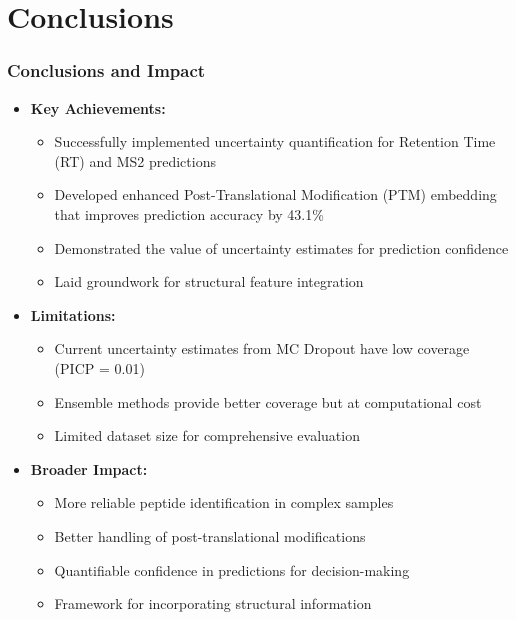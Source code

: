 \documentclass{beamer}
\begin{document}
\section{Conclusions}
\begin{frame}
  \frametitle{Conclusions and Impact}
  \begin{itemize}
    \item \textbf{Key Achievements:}
    \begin{itemize}
      \item Successfully implemented uncertainty quantification for Retention Time (RT) and MS2 predictions
      \item Developed enhanced Post-Translational Modification (PTM) embedding that improves prediction accuracy by 43.1\%
      \item Demonstrated the value of uncertainty estimates for prediction confidence
      \item Laid groundwork for structural feature integration
    \end{itemize}
    \item \textbf{Limitations:}
    \begin{itemize}
      \item Current uncertainty estimates from MC Dropout have low coverage (PICP = 0.01)
      \item Ensemble methods provide better coverage but at computational cost
      \item Limited dataset size for comprehensive evaluation
    \end{itemize}
    \item \textbf{Broader Impact:}
    \begin{itemize}
      \item More reliable peptide identification in complex samples
      \item Better handling of post-translational modifications
      \item Quantifiable confidence in predictions for decision-making
      \item Framework for incorporating structural information
    \end{itemize}
  \end{itemize}
\end{frame}
\end{document}
